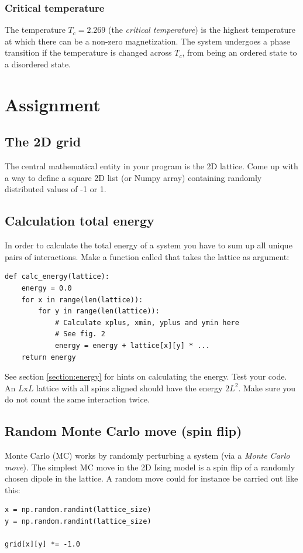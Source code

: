 \documentclass{article}
\begin{document}
\subsubsection{Critical temperature}
The temperature $T_c = 2.269$ (the \textit{critical temperature}) is the highest temperature at which there can be a non-zero magnetization. The system undergoes a phase transition if the temperature is changed across $T_c$, from being an ordered state to a disordered state.

\newpage
\section{Assignment}
\subsection{The 2D grid}

The central mathematical entity in your program is the 2D lattice.
Come up with a way to define a square 2D list (or Numpy array)
containing randomly distributed values of -1 or 1.

\subsection{Calculation total energy}
In order to calculate the total energy of a system you have to sum up all
unique pairs of interactions. Make a function called  that
takes the lattice as argument:
\begin{lstlisting}
def calc_energy(lattice):
    energy = 0.0
    for x in range(len(lattice)):
        for y in range(len(lattice)):
            # Calculate xplus, xmin, yplus and ymin here
            # See fig. 2
            energy = energy + lattice[x][y] * ...
    return energy
\end{lstlisting}

See section \ref{section:energy} for hints on calculating the energy.
Test your code.
An $L$x$L$ lattice with all spins aligned should have the energy $2L^2$.
Make sure you do not count the same interaction twice.\\

\subsection{Random Monte Carlo move (spin flip)}
Monte Carlo (MC) works by randomly perturbing a
system (via a \textit{Monte Carlo move}).
The simplest MC move in the 2D Ising model 
is a spin flip of a randomly chosen dipole in the lattice.
A random move could for instance be carried out like this:
\begin{lstlisting}
x = np.random.randint(lattice_size)
y = np.random.randint(lattice_size)

grid[x][y] *= -1.0
\end{lstlisting}
\end{document}
